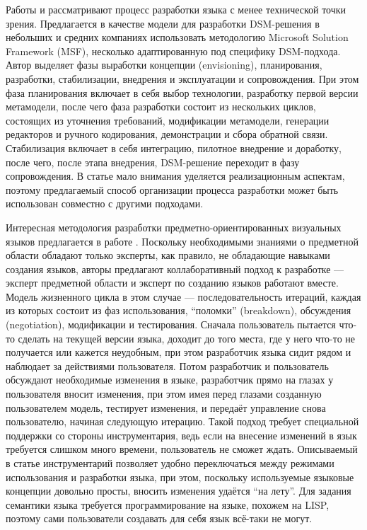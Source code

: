 Работы \cite{koznov2011process} и \cite{koznov2008development} рассматривают процесс 
разработки языка с менее технической точки зрения. Предлагается в качестве модели 
для разработки DSM-решения в небольших и средних компаниях использовать методологию 
Microsoft Solution Framework (MSF), несколько адаптированную под специфику DSM-подхода. 
Автор выделяет фазы выработки концепции (envisioning), планирования, разработки, стабилизации, 
внедрения и эксплуатации и сопровождения. При этом фаза планирования включает в себя выбор 
технологии, разработку первой версии метамодели, после чего фаза разработки состоит из нескольких 
циклов, состоящих из уточнения требований, модификации метамодели, генерации редакторов 
и ручного кодирования, демонстрации и сбора обратной связи. Стабилизация включает 
в себя интеграцию, пилотное внедрение и доработку, после чего, после этапа внедрения, 
DSM-решение переходит в фазу сопровождения. В статье мало внимания уделяется реализационным 
аспектам, поэтому предлагаемый способ организации процесса разработки может быть использован 
совместно с другими подходами.

Интересная методология разработки предметно-ориентированных визуальных языков предлагается 
в работе \cite{repenning1995agentsheets}. Поскольку необходимыми знаниями о предметной 
области обладают только эксперты, как правило, не обладающие навыками создания языков, 
авторы предлагают коллаборативный подход к разработке --- эксперт предметной области 
и эксперт по созданию языков работают вместе. Модель жизненного цикла в этом случае 
--- последовательность итераций, каждая из которых состоит из фаз использования, "`поломки"' 
(breakdown), обсуждения (negotiation), модификации и тестирования. Сначала пользователь 
пытается что-то сделать на текущей версии языка, доходит до того места, где у него 
что-то не получается или кажется неудобным, при этом разработчик языка сидит рядом 
и наблюдает за действиями пользователя. Потом разработчик и пользователь обсуждают 
необходимые изменения в языке, разработчик прямо на глазах у пользователя вносит изменения, 
при этом имея перед глазами созданную пользователем модель, тестирует изменения, и 
передаёт управление снова пользователю, начиная следующую итерацию. Такой подход требует 
специальной поддержки со стороны инструментария, ведь если на внесение изменений в 
язык требуется слишком много времени, пользователь не сможет ждать. Описываемый в 
статье инструментарий позволяет удобно переключаться между режимами использования и 
разработки языка, при этом, поскольку используемые языковые концепции довольно просты, 
вносить изменения удаётся "`на лету"'. Для задания семантики языка требуется программирование 
на языке, похожем на LISP, поэтому сами пользователи создавать для себя язык всё-таки 
не могут.

